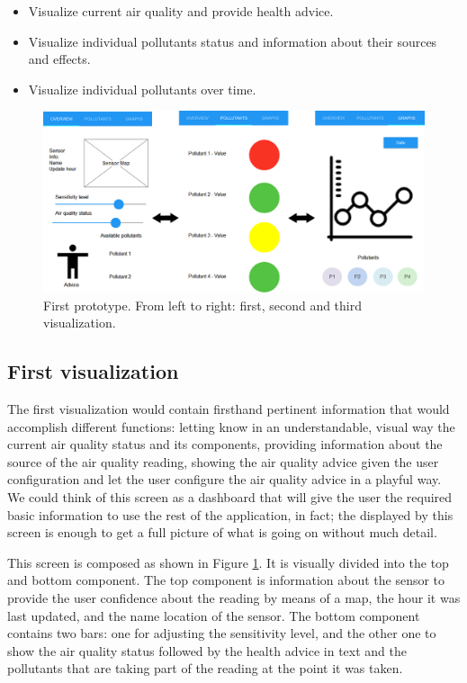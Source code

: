 \begin{itemize}
	\item Visualize current air quality and provide health advice.
    \item Visualize individual pollutants status and information about their sources and effects.
    \item Visualize individual pollutants over time.
\end{itemize}


\begin{figure}[H]
\begin{adjustbox}{width=1.2\textwidth,center=\textwidth}
  \centering
  \includegraphics[scale=1]{images/firstPrototype.png}
\end{adjustbox}
  \caption[Frist prototype]{First prototype. From left to right: first, second and third visualization.}
  \label{fig:first_visualization_first_prototype}
\end{figure}


\subsection{First visualization}

The first visualization would contain firsthand pertinent information that would accomplish different functions: letting know in an understandable, visual way the current air quality status and its components, providing information about the source of the air quality reading, showing the air quality advice given the user configuration and let the user configure the air quality advice in a playful way. We could think of this screen as a dashboard that will give the user the required basic information to use the rest of the application, in fact; the displayed by this screen is enough to get a full picture of what is going on without much detail.

This screen is composed as shown in Figure \ref{fig:first_visualization_first_prototype}. It is visually divided into the top and bottom component. The top component is information about the sensor to provide the user confidence about the reading by means of a map, the hour it was last updated, and the name location of the sensor. The bottom component contains two bars: one for adjusting the sensitivity level, and the other one to show the air quality status followed by the health advice in text and the pollutants that are taking part of the reading at the point it was taken. 

